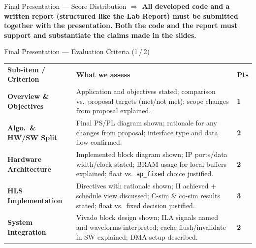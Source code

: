 \documentclass[10pt,aspectratio=169]{beamer}
\begin{document}
\begin{frame}{Final Presentation --- Score Distribution}
\vspace{0.12cm}
{\small\color{Orange}\textbf{$\Rightarrow$ All developed code and a written report (structured like the Lab Report) must be submitted together with the presentation. Both the code and the report must support and substantiate the claims made in the slides.}}
\end{frame}

\begin{frame}{Final Presentation --- Evaluation Criteria (1\,/\,2)}
\setlength{\extrarowheight}{2pt}\setlength{\tabcolsep}{4pt}
\begin{tabular}{m{3.8cm}m{8.8cm}>{\raggedleft\arraybackslash}m{1.4cm}}
\rowcolor{CF}
\textbf{\color{white}Sub-item / Criterion} &
\textbf{\color{white}What we assess} &
\textbf{\color{white}Pts} \tabularnewline
\textbf{Overview \& Objectives} &
  {\color{TxtMd}Application and objectives stated; comparison vs.\ proposal targets (met/not met); scope changes from proposal explained.} &
  \textbf{\color{CF}1} \tabularnewline
\textbf{Algo.\ \& HW/SW Split} &
  {\color{TxtMd}Final PS/PL diagram shown; rationale for any changes from proposal; interface type and data flow confirmed.} &
  \textbf{\color{CF}2} \tabularnewline
\textbf{Hardware Architecture} &
  {\color{TxtMd}Implemented block diagram shown; IP ports/data width/clock stated; BRAM usage for local buffers explained; float vs.\ \texttt{ap\_fixed} choice justified.} &
  \textbf{\color{CF}2} \tabularnewline
\textbf{HLS Implementation} &
  {\color{TxtMd}Directives with rationale shown; II achieved + schedule view discussed; C-sim \& co-sim results stated; float vs.\ fixed decision justified.} &
  \textbf{\color{CF}3} \tabularnewline
\textbf{System Integration} &
  {\color{TxtMd}Vivado block design shown; ILA signals named and waveforms interpreted; cache flush/invalidate in SW explained; DMA setup described.} &
  \textbf{\color{CF}2} \tabularnewline
\end{tabular}
\end{frame}
\end{document}
